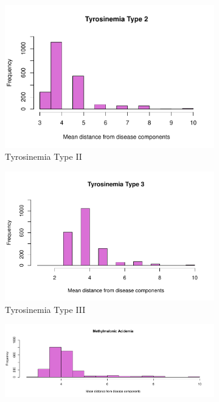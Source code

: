 \begin{figure}[h!]
\begin{subfigure}[b]{0.3\textwidth}
         \includegraphics[scale=0.25]{Images/Tyrosinemia Type II.pdf}
         \caption{Tyrosinemia Type II}
         \label{fig:Tyrosinemia Type II}
     \end{subfigure}
     \hfill
     \begin{subfigure}[b]{0.3\textwidth}
         \centering
         \includegraphics[scale=0.25]{Images/Tyrosinemia Type III.pdf}
         \caption{Tyrosinemia Type III}
         \label{fig:Tyrosinemia Type III}
     \end{subfigure}
     \hfill
     \begin{subfigure}[b]{0.3\textwidth}
         \centering
         \includegraphics[scale=0.25]{Images/Methylmalonic Acidemia.pdf}

\end{subfigure}
\end{figure}
